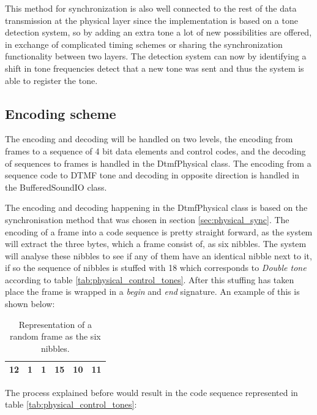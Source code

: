 	This method for synchronization is also well connected to the rest of the
	data transmission at the physical layer since the implementation is based on a tone detection system, so by adding an extra tone a lot of new
	possibilities are offered, in exchange of complicated timing schemes or sharing the synchronization functionality between two layers.
	The detection system can now by identifying a shift in tone frequencies detect that a new tone was sent and thus the system is able to
	register the tone.
	
	\subsection{Encoding scheme}\label{sub:encoding_scheme}
	The encoding and decoding will be handled on two levels, the encoding from frames to a sequence of 4 bit data elements and control codes, and the decoding of sequences to frames is handled in the DtmfPhysical class. The encoding from a sequence code to DTMF tone and decoding in opposite direction is handled in the BufferedSoundIO class.
		
	The encoding and decoding happening in the DtmfPhysical class is based on the synchronisation method that was chosen in section \ref{sec:physical_sync}. The encoding of a frame into a code sequence is pretty straight forward, as the system will extract the three bytes, which a frame consist of, as six nibbles. The system will analyse these nibbles to see if any of them have an identical nibble next to it, if so the sequence of nibbles is stuffed with 18 which corresponds to \textit{Double tone} according to table \ref{tab:physical_control_tones}. After this stuffing has taken place the frame is wrapped in a \textit{begin} and \textit{end} signature. An example of this is shown below:
	
	\begin{table}[htb]
		\begin{center}
			\begin{tabular}{|c|c|c|c|c|c|}
			\hline
			12 & 1 & 1 & 15 & 10 & 11 \\
			\hline
			\end{tabular}
		\end{center}
		\caption{Representation of a random frame as the six nibbles.}
		\label{tab:physical_frame}
	\end{table}
	
	The process explained before would result in the code sequence represented in table \ref{tab:physical_control_tones}:
	

